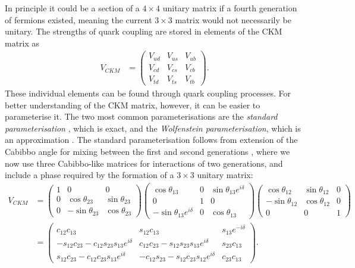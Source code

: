 \documentclass[a4paper,12pt]{article}
\begin{document}
In principle it could be a section of a $4\times4$ unitary matrix if a fourth generation of fermions existed, meaning the current $3\times3$ matrix would not necessarily be unitary. 
The strengths of quark coupling are stored in elements of the CKM matrix as
\begin{align}
    \label{eq:ckmub}
    V_{CKM} &= \begin{pmatrix}V_{ud}&V_{us}&V_{ub}\\V_{cd}&V_{cs}&V_{cb}\\V_{td}&V_{ts}&V_{tb}\end{pmatrix}.
\end{align}
These individual elements can be found through quark coupling processes. 
For better understanding of the CKM matrix, however, it can be easier to parameterise it. 
The two most common parameterisations are the \emph{standard parameterisation} \cite{pdg}, which is exact, and the \emph{Wolfenstein parameterisation}, which is an approximation \cite{wolf}.
The standard parameterisation follows from extension of the Cabibbo angle for mixing between the first and second generations \cite{cabibbo}, where we now use three Cabibbo-like matrices for interactions of two generations, and include a phase required by the formation of a $3\times3$ unitary matrix:
\begin{equation}
    \label{eq:standpar}
    \begin{split}
        V_{CKM} &= \begin{pmatrix}1&0&0\\0&\cos\theta_{23}&\sin\theta_{23}\\0&-\sin\theta_{23}&\cos\theta_{23}\end{pmatrix}\begin{pmatrix}\cos\theta_{13}&0&\sin\theta_{13}e^{i\delta}\\0&1&0\\-\sin\theta_{13}e^{i\delta}&0&\cos\theta_{13}\end{pmatrix}\begin{pmatrix}\cos\theta_{12}&\sin\theta_{12}&0\\-\sin\theta_{12}&\cos\theta_{12}&0\\0&0&1\end{pmatrix}\\
                &= \begin{pmatrix}c_{12}c_{13} & s_{12}c_{13} & s_{13}e^{-i\delta} \\ -s_{12}c_{23}-c_{12}s_{23}s_{13}e^{i\delta} & c_{12}c_{23}-s_{12}s_{23}s_{13}e^{i\delta} & s_{23}c_{13} \\ s_{12}c_{23}-c_{12}c_{23}s_{13}e^{i\delta} & -c_{12}s_{23}-s_{12}c_{23}s_{12}e^{i\delta} & c_{23}c_{13}\end{pmatrix}.
    \end{split}
\end{equation}
\end{document}
